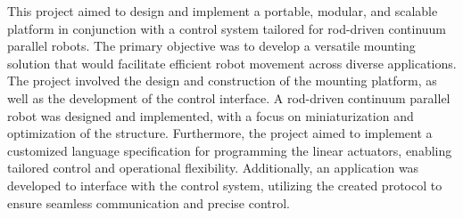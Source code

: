 \par This project aimed to design and implement a portable, modular, and scalable platform in conjunction with a control system tailored for rod-driven continuum parallel robots. The primary objective was to develop a versatile mounting solution that would facilitate efficient robot movement across diverse applications. The project involved the design and construction of the mounting platform, as well as the development of the control interface. A rod-driven continuum parallel robot was designed and implemented, with a focus on miniaturization and optimization of the structure. Furthermore, the project aimed to implement a customized language specification for programming the linear actuators, enabling tailored control and operational flexibility. Additionally, an application was developed to interface with the control system, utilizing the created protocol to ensure seamless communication and precise control.